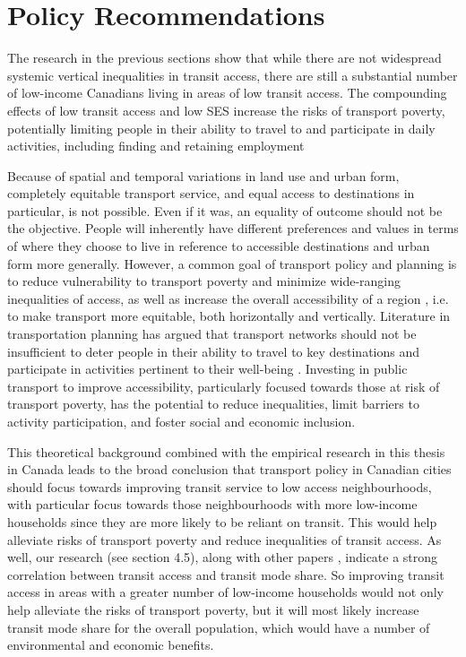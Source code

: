 \documentclass[11 pt, letterpaper]{article}
\begin{document}
{\newpage

\section{Policy Recommendations}

The research in the previous sections show that while there are not widespread systemic vertical inequalities in transit access, there are still a substantial number of low-income Canadians living in areas of low transit access. The compounding effects of low transit access and low SES increase the risks of transport poverty, potentially limiting people in their ability to travel to and participate in daily activities, including finding and retaining employment \cite{preston2007,lucas2012}

Because of spatial and temporal variations in land use and urban form, completely equitable transport service, and equal access to destinations in particular, is not possible. Even if it was, an equality of outcome should not be the objective. People will inherently have different preferences and values in terms of where they choose to live in reference to accessible destinations and urban form more generally. However, a common goal of transport policy and planning is to reduce vulnerability to transport poverty and minimize wide-ranging inequalities of access, as well as increase the overall accessibility of a region \cite{seu2003,martens2012justice,martens2016,pereira2017}, i.e. to make transport more equitable, both horizontally and vertically. Literature in transportation planning has argued that transport networks should not be insufficient to deter people in their ability to travel to key destinations and participate in activities pertinent to their well-being \cite{preston2007,lucas2012,martens2016}. Investing in public transport to improve accessibility, particularly focused towards those at risk of transport poverty, has the potential to reduce inequalities, limit barriers to activity participation, and foster social and economic inclusion. 

This theoretical background combined with the empirical research in this thesis in Canada leads to the broad conclusion that transport policy in Canadian cities should focus towards improving transit service to low access neighbourhoods, with particular focus towards those neighbourhoods with more low-income households since they are more likely to be reliant on transit. This would help alleviate risks of transport poverty and reduce inequalities of transit access. As well, our research (see section 4.5), along with other papers \cite{owen2015,boisjoly2016}, indicate a strong correlation between transit access and transit mode share. So improving transit access in areas with a greater number of low-income households would not only help alleviate the risks of transport poverty, but it will most likely increase transit mode share for the overall population, which would have a number of environmental and economic benefits. 

}
\end{document}
